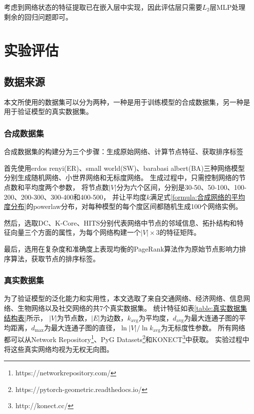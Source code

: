 \documentclass[twocolumn]{morningstar}
\begin{document}
考虑到网络状态的特征提取已在嵌入层中实现，因此评估层只需要$L_2$层MLP处理剩余的回归问题即可。


\section{实验评估}\label{sec:ExperimentalEvaluation}

\subsection{数据来源}\label{sec:DataCollection}

本文所使用的数据集可以分为两种，一种是用于训练模型的合成数据集，另一种是用于验证模型的真实数据集。


\subsubsection{合成数据集}\label{sec:SyntheticDataset}

合成数据集的构建分为三个步骤：生成原始网络、计算节点特征、获取排序标签

首先使用erdos renyi(ER)、small world(SW)、barabasi albert(BA)三种网络模型分别生成随机网络、小世界网络和无标度网络。
生成过程中，只需控制网络的节点数和平均度两个参数，
将节点数$|V|$分为六个区间，分别是30-50、50-100、100-200、200-300、300-400和400-500，
并让平均度$k$满足式\ref{formula:合成网络的平均度分布}的powerlaw分布，对每种模型的每个度区间都随机生成100个网络实例。



然后，选取DC、K-Core、HITS分别代表网络中节点的邻域信息、拓扑结构和特征向量三个方面的属性，为每个网络构建一个$|V|\times3$的特征矩阵。

最后，选用在复杂度和准确度上表现均衡的PageRank算法作为原始节点影响力排序算法，获取节点的排序标签。


\subsubsection{真实数据集}\label{sec:RealDataset}



为了验证模型的泛化能力和实用性，本文选取了来自交通网络、经济网络、信息网络、生物网络以及社交网络的共7个真实数据集。
统计特征如表\ref{table:真实数据集结构表}所示，
$|V|$为节点数，$|E|$为边数，$k_{\mathrm{avg}}$为平均度，$d_{\mathrm{avg}}$为最大连通子图的平均距离，$d_{\mathrm{max}}$为最大连通子图的直径，$\ln |V|/\ln k_\mathrm{avg}$为无标度性参数。
所有网络都可以从Network Repository\footnote{https://networkrepository.com/}、PyG Datasets\footnote{https://pytorch-geometric.readthedocs.io/}和KONECT\footnote{http://konect.cc/}中获取。
实验过程中将这些真实网络均视为无权无向图。
\end{document}
